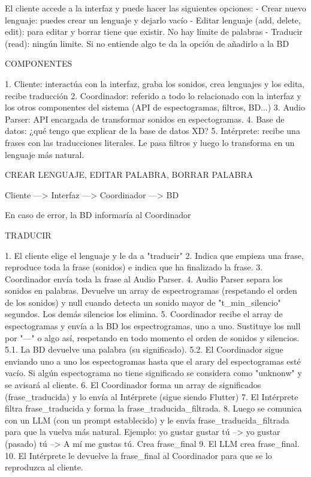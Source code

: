 El cliente accede a la interfaz y puede hacer las siguientes opciones:
-	Crear nuevo lenguaje: puedes crear un lenguaje y dejarlo vacío
-	Editar lenguaje (add, delete, edit): para editar y borrar tiene que existir. No hay límite de palabras
-	Traducir (read): ningún limite. Si no entiende algo te da la opción de añadirlo a la BD



COMPONENTES

1. Cliente: interactúa con la interfaz, graba los sonidos, crea lenguajes y los edita, recibe traducción
2. Coordinador: referido a todo lo relacionado con la interfaz y los otros componentes del sistema (API de espectogramas, filtros, BD...)
3. Audio Parser: API encargada de transformar sonidos en espectogramas. 
4. Base de datos: ¿qué tengo que explicar de la base de datos XD?
5. Intérprete: recibe una frases con las traducciones literales. Le pasa filtros y luego lo transforma en un lenguaje más natural.


CREAR LENGUAJE, EDITAR PALABRA, BORRAR PALABRA

Cliente ---> Interfaz ---> Coordinador ---> BD

En caso de error, la BD informaría al Coordinador


TRADUCIR

1. El cliente elige el lenguaje y le da a "traducir"
2. Indica que empieza una frase, reproduce toda la frase (sonidos) e indica que ha finalizado la frase.
3. Coordinador envía toda la frase al Audio Parser.
4. Audio Parser separa los sonidos en palabras. Devuelve un array de espectrogramas (respetando el orden de los sonidos) y null cuando detecta un sonido mayor de "t_min_silencio" segundos. Los demás silencios los elimina. 
5. Coordinador recibe el array de espectogramas y envía a la BD los espectrogramas, uno a uno. Sustituye los null por "---" o algo así, respetando en todo momento el orden de sonidos y silencios.
5.1. La BD devuelve una palabra (su significado). 
5.2. El Coordinador sigue enviando uno a uno los espectogramas hasta que el arary del espectogramas esté vacío. Si algún espectograma no tiene significado se considera como "unknonw" y se avisará al cliente. 
6. El Coordinador forma un array de significados (frase_traducida) y lo envía al Intérprete (sigue siendo Flutter)
7. El Intérprete filtra frase_traducida y forma la frase_traducida_filtrada.
8. Luego se comunica con un LLM (con un prompt establecido) y le envía frase_traducida_filtrada para que la vuelva más natural. Ejemplo: yo gustar gustar tú --> yo gustar (pasado) tú --> A mí me gustas tú. Crea frase_final
9. El LLM crea frase_final.
10. El Intérprete le devuelve la frase_final al Coordinador para que se lo reproduzca al cliente. 

